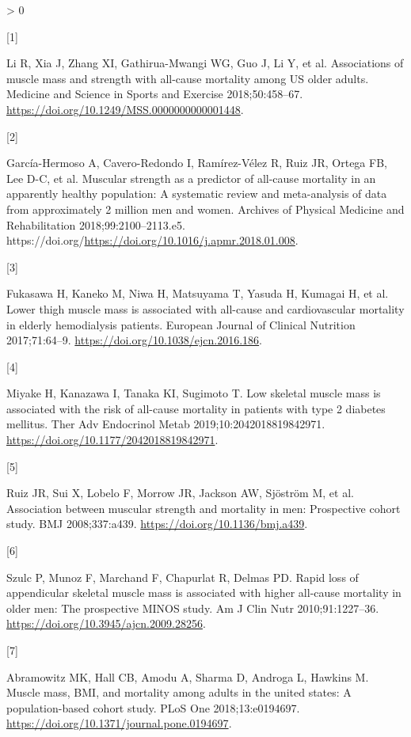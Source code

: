 \documentclass[twoside,10pt]{gihclass} %
\newlength{\cslhangindent}
\newlength{\csllabelwidth}
\newenvironment{CSLReferences}[3] %
 {%
  \setlength{\parindent}{0pt}
  \ifodd #1 \everypar{\setlength{\hangindent}{\cslhangindent}}\ignorespaces\fi
  \ifnum #2 > 0
  \setlength{\parskip}{#2\baselineskip}
  \fi
 }%
 {}
\newcommand{\CSLLeftMargin}[1]{\parbox[t]{\maxof{\widthof{#1}}{\csllabelwidth}}{#1}}
\newcommand{\CSLRightInline}[1]{\parbox[t]{\linewidth}{#1}}
\begin{document}
\hypertarget{refs}{}
\begin{CSLReferences}{0}{0}
\leavevmode\hypertarget{ref-RN2512}{}%
\CSLLeftMargin{{[}1{]} }
\CSLRightInline{Li R, Xia J, Zhang XI, Gathirua-Mwangi WG, Guo J, Li Y, et al. Associations of muscle mass and strength with all-cause mortality among US older adults. Medicine and Science in Sports and Exercise 2018;50:458--67. \url{https://doi.org/10.1249/MSS.0000000000001448}.}

\leavevmode\hypertarget{ref-RN2808}{}%
\CSLLeftMargin{{[}2{]} }
\CSLRightInline{García-Hermoso A, Cavero-Redondo I, Ramírez-Vélez R, Ruiz JR, Ortega FB, Lee D-C, et al. Muscular strength as a predictor of all-cause mortality in an apparently healthy population: A systematic review and meta-analysis of data from approximately 2 million men and women. Archives of Physical Medicine and Rehabilitation 2018;99:2100--2113.e5. https://doi.org/\url{https://doi.org/10.1016/j.apmr.2018.01.008}.}

\leavevmode\hypertarget{ref-RN2513}{}%
\CSLLeftMargin{{[}3{]} }
\CSLRightInline{Fukasawa H, Kaneko M, Niwa H, Matsuyama T, Yasuda H, Kumagai H, et al. Lower thigh muscle mass is associated with all-cause and cardiovascular mortality in elderly hemodialysis patients. European Journal of Clinical Nutrition 2017;71:64--9. \url{https://doi.org/10.1038/ejcn.2016.186}.}

\leavevmode\hypertarget{ref-RN2514}{}%
\CSLLeftMargin{{[}4{]} }
\CSLRightInline{Miyake H, Kanazawa I, Tanaka KI, Sugimoto T. Low skeletal muscle mass is associated with the risk of all-cause mortality in patients with type 2 diabetes mellitus. Ther Adv Endocrinol Metab 2019;10:2042018819842971. \url{https://doi.org/10.1177/2042018819842971}.}

\leavevmode\hypertarget{ref-RN2809}{}%
\CSLLeftMargin{{[}5{]} }
\CSLRightInline{Ruiz JR, Sui X, Lobelo F, Morrow JR, Jackson AW, Sjöström M, et al. Association between muscular strength and mortality in men: Prospective cohort study. BMJ 2008;337:a439. \url{https://doi.org/10.1136/bmj.a439}.}

\leavevmode\hypertarget{ref-RN2515}{}%
\CSLLeftMargin{{[}6{]} }
\CSLRightInline{Szulc P, Munoz F, Marchand F, Chapurlat R, Delmas PD. Rapid loss of appendicular skeletal muscle mass is associated with higher all-cause mortality in older men: The prospective MINOS study. Am J Clin Nutr 2010;91:1227--36. \url{https://doi.org/10.3945/ajcn.2009.28256}.}

\leavevmode\hypertarget{ref-RN2516}{}%
\CSLLeftMargin{{[}7{]} }
\CSLRightInline{Abramowitz MK, Hall CB, Amodu A, Sharma D, Androga L, Hawkins M. Muscle mass, BMI, and mortality among adults in the united states: A population-based cohort study. PLoS One 2018;13:e0194697. \url{https://doi.org/10.1371/journal.pone.0194697}.}


\end{CSLReferences}
\end{document}
